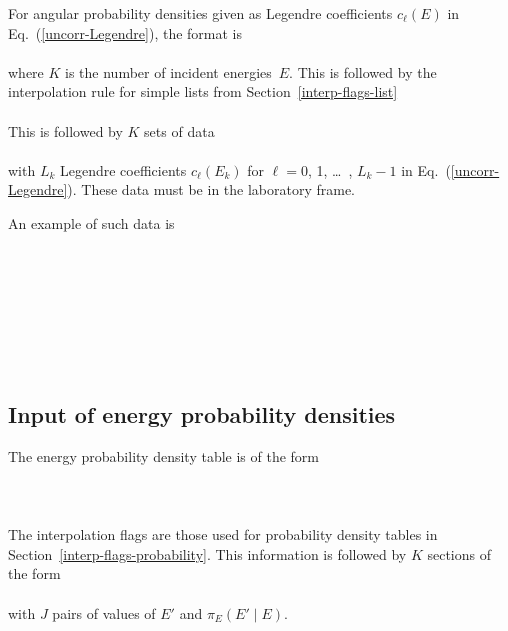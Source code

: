 For angular probability densities given as Legendre coefficients 
$c_\ell(E)$ in Eq.~(\ref{uncorr-Legendre}), the format is\\
    \\
where $K$ is the number of incident energies~$E$.
This is followed by the interpolation rule for simple lists
from Section~\ref{interp-flags-list}\\
  \\
This is followed by $K$ sets of data\\
    \\
with $L_k$ Legendre coefficients $c_\ell(E_k)$ for $\ell = 0$, 1,
\ldots\ , $L_k - 1$ in Eq.~(\ref{uncorr-Legendre}).
These data must be in the laboratory frame.

An example of such data is\\
  \\
  \\
  \\
    \\
     \\
  \\
     \\
 
\subsection{Input of energy probability densities}
The energy probability density table is of the form\\
  \\
  \\
  \\
The interpolation flags are those used for
probability density tables in Section~\ref{interp-flags-probability}.
This information is followed
by $K$ sections of the form\\
  \\
with $J$ pairs of values of $E'$ and $\pi_E(E'   \mid E)$.

